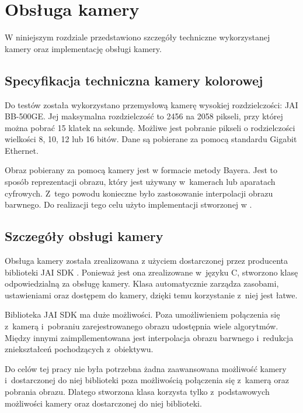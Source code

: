 \chapter{Obsługa kamery}
\label{cha:obslugakamery}

W niniejszym rozdziale przedstawiono szczegóły techniczne wykorzystanej kamery oraz implementację obsługi kamery.

\section{Specyfikacja techniczna kamery kolorowej}
\label{sec:specyfikacjaKamery}

Do testów została wykorzystano przemysłową kamerę wysokiej rozdzielczości: JAI BB-500GE. Jej maksymalna rozdzielczość to 2456 na 2058 pikseli, przy której można pobrać 15 klatek na sekundę. Możliwe jest pobranie pikseli o rodzielczości wielkości 8, 10, 12 lub 16 bitów. Dane są pobierane za pomocą standardu Gigabit Ethernet. 

Obraz pobierany za pomocą kamery jest w formacie metody Bayera. Jest to sposób reprezentacji obrazu, który jest używany w~kamerach lub aparatach cyfrowych. Z~tego powodu konieczne było zastosowanie interpolacji obrazu barwnego. Do realizacji tego celu użyto implementacji stworzonej w \cite{BFIOCL}.

\section{Szczegóły obsługi kamery}
\label{sec:szczegolyObslugiKamery}

Obsługa kamery została zrealizowana z użyciem dostarczonej przez producenta biblioteki JAI SDK \cite{JAISDK}. Ponieważ jest ona zrealizowane w~języku C, stworzono klasę odpowiedzialną za obsługę kamery. Klasa automatycznie zarządza zasobami, ustawieniami oraz dostępem do kamery, dzięki temu korzystanie z~niej jest łatwe.

Biblioteka JAI SDK ma duże możliwości. Poza umożliwieniem połączenia się z~kamerą i~pobraniu zarejestrowanego obrazu udostępnia wiele algorytmów. Między innymi zaimpllementowana jest interpolacja obrazu barwnego i~redukcja zniekształceń pochodzących z~obiektywu.

Do celów tej pracy nie była potrzebna żadna zaawansowana możliwość kamery i~dostarczonej do niej biblioteki poza możliwością połączenia się z~kamerą oraz pobrania obrazu. Dlatego stworzona klasa korzysta tylko z~podstawowych możliwości kamery oraz dostarczonej do niej biblioteki.

